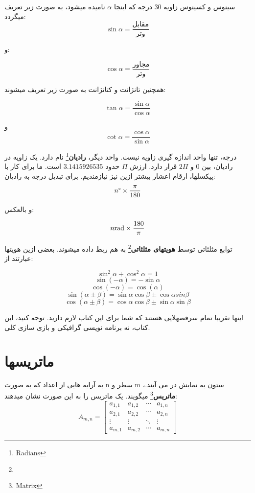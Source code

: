 \documentclass[14pt,a4paper]{memoir}
\begin{document}
	 سینوس و کسینوس زاویه 30 درجه که اینجا $ \alpha $ نامیده میشود، به صورت زیر تعریف میگردد:
	 \[ \sin \alpha = \frac{\text{مقابل}}{\text{وتر}} \]
	 
	 و:
	 
	 \[ \cos \alpha = \frac{\text{مجاور}}{\text{وتر}} \]
	 
	 همچنین تانژانت و کتانژانت به صورت زیر تعریف میشوند:
	 
	  \[ \tan \alpha = \frac{\sin \alpha}{\cos \alpha} \]
	  
	  
	  و 
	  \[ \cot \alpha = \frac{\cos \alpha}{\sin \alpha} \]
	  
	  
	  درجه، تنها واحد اندازه گیری زاویه نیست. واحد دیگر، \textbf{رادیان}\footnote{Radians} نام دارد. یک زاویه در رادیان، بین $ 0 $ و $   2\Pi $ قرار دارد. ارزش $ \Pi $ حدود $ 3.1415926535 $ است. ما برای کار با پیکسلها، ارقام اعشار بیشتر ازین نیز نیازمندیم. برای تبدیل درجه به رادیان:
	  \[ n\degree \times 	  \frac{\pi}{180} \]
	  
	  و بالعکس:
	  
	  \[ n \space \textrm{rad} \times 	  \frac{180}{\pi} \]
	  
	  
	  
	  
	  توابع مثلثاتی توسط \textbf{هویتهای مثلثاتی}\footnote{} به هم ربط داده میشوند. بعضی ازین هویتها عبارتند از:
	  
	  \[ \sin^2 \alpha + \cos^2 \alpha = 1 \]
	  \[ \sin(-\alpha) = -\sin\alpha \]
	  \[ \cos(-\alpha) = \cos(\alpha) \]
	  \[ \sin(\alpha\pm\beta) = \sin\alpha\cos\beta \pm\cos\alpha sin\beta \]
	  \[ \cos(\alpha\pm\beta) = \cos\alpha\cos\beta\pm\sin\alpha\sin\beta \]
	 
	 
	 اینها تقریبا تمام سرفصهلایی هستند که شما برای این کتاب لازم دارید. توجه کنید، این کتاب، نه برنامه نویسی گرافیکی و بازی سازی کلی.
	 
	 \section{ماتریسها}\label{matrix}
	 
	 به آرایه هایی از اعداد که به صورت n سطر و m ستون به نمایش در می آیند.، \textbf{ماتریس}\footnote{Matrix} میگویند. یک ماتریس را به این صورت نشان میدهند:
	 \[ A_{m, n} = \begin{bmatrix}
	  a_{1,1} & a_{1,2} & \cdots & a_{1,n} \\
	 a_{2,1} & a_{2,2} & \cdots & a_{2,n} \\
	 \vdots  & \vdots  & \ddots & \vdots  \\
	 a_{m,1} & a_{m,2} & \cdots & a_{m,n}
	 \end{bmatrix} \]
	 
\end{document}
